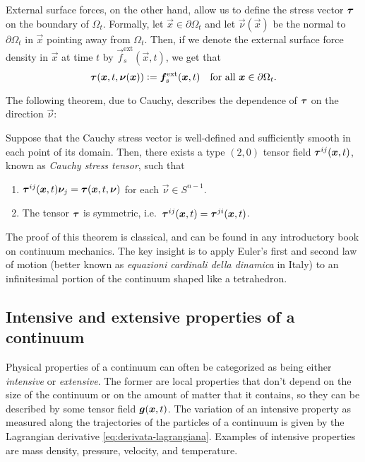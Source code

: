 External surface forces, on the other hand, allow us to define
the stress vector $\bm{\tau}$ on the boundary of $\Omega_t$.
Formally, let $\vec{x} \in \partial \Omega_t$ and let $\vec{\nu}(\vec{x})$
be the normal to $\partial \Omega_t$ in $\vec{x}$ pointing away from $\Omega_t$.
Then, if we denote the external surface force density in $\vec{x}$ at
time $t$ by $\vec{f}_s^{\text{ext}}(\vec{x},t)$, we get that
\begin{equation} \label{eq:sforzo-sul-bordo}
\bm{\tau}(\bm{x},t,\bm{\nu}(\bm{x}))
\vcentcolon= \bm{f}_s^{\text{ext}}(\bm{x},t)
\quad \text{for all $\bm{x} \in \partial \Omega_t$}.
\end{equation}

\noindent The following theorem, due to Cauchy, describes the dependence
of $\bm{\tau}$ on the direction $\vec{\nu}$:
\begin{theo}
Suppose that the Cauchy stress vector is well-defined and sufficiently
smooth in each point of its domain. Then, there exists a type $(2,0)$
tensor field $\bm{\tau}^{ij}(\bm{x},t)$,
known as \emph{Cauchy stress tensor}, such that
\begin{enumerate}
\item $\bm{\tau}^{ij}(\bm{x},t) \bm{\nu}_j = \bm{\tau}(\bm{x},t,\bm{\nu})$
	for each $\vec{\nu} \in S^{n-1}$.
\item The tensor $\bm{\tau}$ is symmetric,
	i.e.\ $\bm{\tau}^{ij}(\bm{x},t) = \bm{\tau}^{ji}(\bm{x},t)$.
\end{enumerate}
\end{theo}

\noindent The proof of this theorem is classical, and can be found
in any introductory book on continuum mechanics.
The key insight is to apply Euler's first and second law of motion
(better known as \emph{equazioni cardinali della dinamica} in Italy)
to an infinitesimal portion of the continuum shaped like a tetrahedron.

\subsection*{Intensive and extensive properties of a continuum}

Physical properties of a continuum can often be categorized as being
either \emph{intensive} or \emph{extensive}. The former are local
properties that don't depend on the size of the continuum or on
the amount of matter that it contains, so they can be described
by some tensor field $\bm{g}(\bm{x},t)$. The variation of an intensive
property as measured along the trajectories of the particles of a continuum
is given by the Lagrangian derivative \eqref{eq:derivata-lagrangiana}.
Examples of intensive properties are mass density, pressure, velocity,
and temperature.

